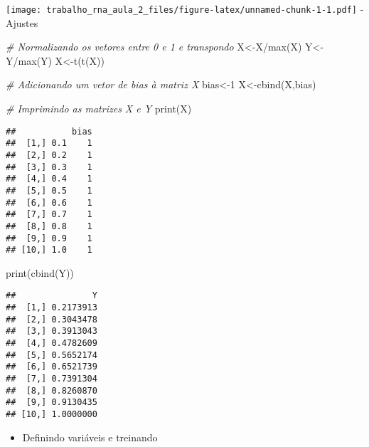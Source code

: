 \documentclass[
]{article}
\newenvironment{Shaded}{\begin{snugshade}}{\end{snugshade}}
\newcommand{\CommentTok}[1]{\textcolor[rgb]{0.56,0.35,0.01}{\textit{#1}}}
\newcommand{\DecValTok}[1]{\textcolor[rgb]{0.00,0.00,0.81}{#1}}
\newcommand{\FunctionTok}[1]{\textcolor[rgb]{0.00,0.00,0.00}{#1}}
\newcommand{\NormalTok}[1]{#1}
\newcommand{\OtherTok}[1]{\textcolor[rgb]{0.56,0.35,0.01}{#1}}
\newcommand{\SpecialCharTok}[1]{\textcolor[rgb]{0.00,0.00,0.00}{#1}}
\providecommand{\tightlist}{%
  \setlength{\itemsep}{0pt}\setlength{\parskip}{0pt}}
\begin{document}
\texttt{[image: trabalho\_rna\_aula\_2\_files/figure-latex/unnamed-chunk-1-1.pdf]}
- Ajustes

\begin{Shaded}
\begin{Highlighting}[]
\CommentTok{\# Normalizando os vetores entre 0 e 1 e transpondo}
\NormalTok{X}\OtherTok{\textless{}{-}}\NormalTok{X}\SpecialCharTok{/}\FunctionTok{max}\NormalTok{(X)}
\NormalTok{Y}\OtherTok{\textless{}{-}}\NormalTok{Y}\SpecialCharTok{/}\FunctionTok{max}\NormalTok{(Y)}
\NormalTok{X}\OtherTok{\textless{}{-}}\FunctionTok{t}\NormalTok{(}\FunctionTok{t}\NormalTok{(X))}

\CommentTok{\# Adicionando um vetor de bias à matriz X}
\NormalTok{bias}\OtherTok{\textless{}{-}}\DecValTok{1}
\NormalTok{X}\OtherTok{\textless{}{-}}\FunctionTok{cbind}\NormalTok{(X,bias)}

\CommentTok{\# Imprimindo as matrizes X e Y}
\FunctionTok{print}\NormalTok{(X)}
\end{Highlighting}
\end{Shaded}

\begin{verbatim}
##           bias
##  [1,] 0.1    1
##  [2,] 0.2    1
##  [3,] 0.3    1
##  [4,] 0.4    1
##  [5,] 0.5    1
##  [6,] 0.6    1
##  [7,] 0.7    1
##  [8,] 0.8    1
##  [9,] 0.9    1
## [10,] 1.0    1
\end{verbatim}

\begin{Shaded}
\begin{Highlighting}[]
\FunctionTok{print}\NormalTok{(}\FunctionTok{cbind}\NormalTok{(Y))}
\end{Highlighting}
\end{Shaded}

\begin{verbatim}
##               Y
##  [1,] 0.2173913
##  [2,] 0.3043478
##  [3,] 0.3913043
##  [4,] 0.4782609
##  [5,] 0.5652174
##  [6,] 0.6521739
##  [7,] 0.7391304
##  [8,] 0.8260870
##  [9,] 0.9130435
## [10,] 1.0000000
\end{verbatim}

\begin{itemize}
\tightlist
\item
  Definindo variáveis e treinando
\end{itemize}
\end{document}
